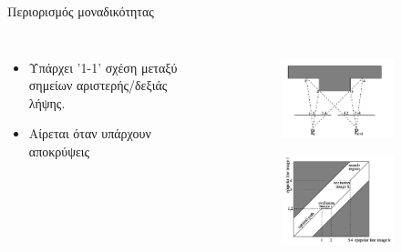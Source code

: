 \documentclass[english,greek]{beamer}
\begin{document}
\begin{frame}{Περιορισμός μοναδικότητας}
	\begin{columns}[onlytextwidth]
		\begin{itemize}
			\item Υπάρχει '1-1' σχέση μεταξύ σημείων αριστερής/δεξιάς λήψης.
			\item Αίρεται όταν υπάρχουν αποκρύψεις
		\end{itemize}	

		\begin{figure}
			\centering
			\begin{subfigure}{\textwidth}
			\includegraphics[width=\textwidth, height = 0.5\textwidth]{uniqueness2.png}
			\end{subfigure}
			
			\begin{subfigure}{\textwidth}
			\includegraphics[width=\textwidth, height = 0.5\textwidth]{uniqueness1.png}
			\end{subfigure}
		\end{figure}
	\end{columns}
\end{frame}
\end{document}
